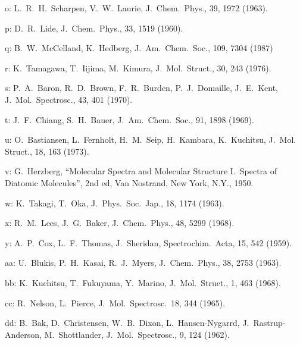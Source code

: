 \begin{description}
\item{   o: } L.\ R.\ H.\ Scharpen, V.\ W.\ Laurie, J.\ Chem.\ Phys., 39, 1972 (1963).
  
\item{   p: } D.\ R.\ Lide, J.\ Chem.\ Phys., 33, 1519 (1960).
  
\item{   q: } B.\ W.\ McCelland, K.\ Hedberg, J.\ Am.\ Chem.\ Soc., 109, 7304 (1987)
  
\item{   r: } K.\ Tamagawa, T.\ Iijima, M.\ Kimura, J.\ Mol.\ Struct., 30, 243 (1976).
  
\item{   s: } P.\ A.\ Baron, R.\ D.\ Brown, F.\ R.\ Burden, P.\ J.\ Domaille, J.\ E.\ Kent,
       J.\ Mol.\ Spectrosc., 43, 401 (1970).
  
\item{   t: } J.\ F.\ Chiang, S.\ H.\ Bauer, J.\ Am.\ Chem.\ Soc., 91, 1898 (1969).
  
\item{   u: } O.\ Bastiansen, L.\ Fernholt, H.\ M.\ Seip, H.\ Kambara, K.\ Kuchitsu, J.\ Mol.
       Struct., 18, 163 (1973).
  
\item{   v: } G.\ Herzberg, ``Molecular Spectra and Molecular Structure I.\ Spectra of
       Diatomic Molecules'', 2nd ed, Van Nostrand, New York, N.Y., 1950.
  
\item{   w: } K.\ Takagi, T.\ Oka, J.\ Phys.\ Soc.\ Jap., 18, 1174 (1963).
  
\item{   x: } R.\ M.\ Lees, J.\ G.\ Baker, J.\ Chem.\ Phys., 48, 5299 (1968).
  
\item{   y: } A.\ P.\ Cox, L.\ F.\ Thomas, J.\ Sheridan, Spectrochim.\ Acta, 15, 542 (1959).
  
  
\item{  aa: } U.\ Blukis, P.\ H.\ Kasai, R.\ J.\ Myers, J.\ Chem.\ Phys., 38, 2753 (1963).
  
\item{  bb: } K.\ Kuchitsu, T.\ Fukuyama, Y.\ Marino, J.\ Mol.\ Struct., 1, 463 (1968).
  
\item{  cc: } R.\ Nelson, L.\ Pierce, J.\ Mol.\ Spectrosc.\ 18, 344 (1965).
  
\item{  dd: } B.\ Bak, D.\ Christensen, W.\ B.\ Dixon, L.\ Hansen-Nygarrd,
       J.\ Rastrup-Anderson, M.\ Shottlander, J.\ Mol.\ Spectrosc., 9, 124 (1962).
  

\end{description}
